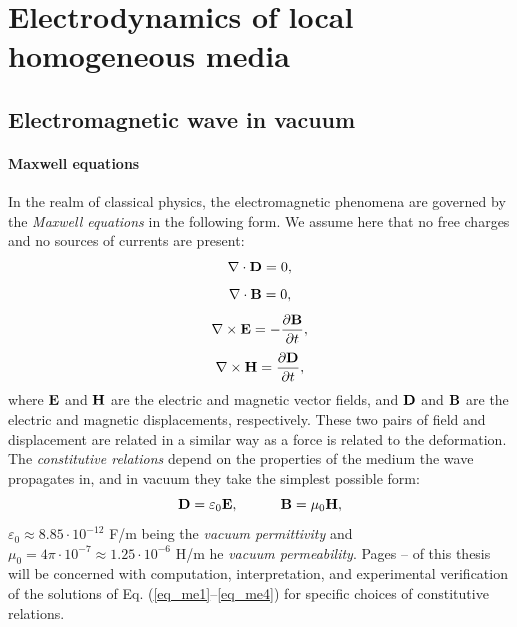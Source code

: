 
\section{Electrodynamics of local homogeneous media} 
\subsection{Electromagnetic wave in vacuum}
\paragraph{Maxwell equations}  %
In the realm of classical physics, the electromagnetic phenomena are governed by the \textit{Maxwell equations} in the following form.
We assume here that no free charges and no sources of currents are present: 
\begin{equation} \nabla \cdot  \mathbf{D} = 0, \label{eq_me1}\end{equation}  
\begin{equation} \nabla \cdot  \mathbf{B} = 0, \label{eq_me2}\end{equation}  
\begin{equation} \nabla \times \mathbf{E} = -\frac{\partial \mathbf{B}} {\partial t}, \label{eq_me3}\end{equation}  
\begin{equation} \nabla \times \mathbf{H} =  \frac{\partial \mathbf{D}} {\partial t}, \label{eq_me4}\end{equation}  
where $\mathbf{E}$ and $\mathbf{H}$ are the electric and magnetic vector fields, and $\mathbf{D}$ and $\mathbf{B}$ are the electric and magnetic displacements,
 respectively. These two pairs of field and displacement are related in a similar way as a force is related to the deformation. %
 The \textit{constitutive relations} depend on the properties of the medium the wave propagates in, and in vacuum they take the simplest possible form:
\begin{equation}		\mathbf{D} = \varepsilon_0	\mathbf{E}, \quad\quad\quad						\mathbf{B} = \mu_0			\mathbf{H},				 \label{eq_ce}\end{equation}
$\varepsilon_0 \approx 8.85\cdot10^{-12}$ F/m being the \textit{vacuum permittivity} and $\mu_0 = 4\pi \cdot 10^{-7} \approx 1.25\cdot10^{-6}$ H/m he \textit{vacuum permeability}. 
Pages \pageref{starttext}--\pageref{endtext} of this thesis will be concerned with computation, interpretation, and experimental verification of the solutions of Eq. (\ref{eq_me1}--\ref{eq_me4})  for specific choices of constitutive relations.
